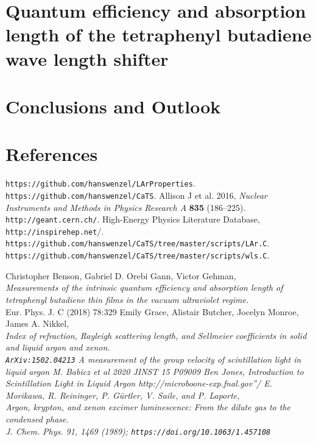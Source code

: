 \documentclass[a4paper]{jpconf}
\begin{document}
\section{Quantum efficiency and absorption length of the tetraphenyl butadiene wave length shifter}

\section{Conclusions and Outlook}

 \section*{References}

 \begin{thebibliography}{99}
   \verb|https://github.com/hanswenzel/LArProperties|.
   \verb|https://github.com/hanswenzel/CaTS|.
 Allison J et al. 2016, {\it Nuclear Instruments and Methods in Physics
                Research A} {\bf 835} (186--225).
 \verb|http://geant.cern.ch/|.
 High-Energy Physics Literature Database,
  \verb"http://inspirehep.net"/.
  \verb|https://github.com/hanswenzel/CaTS/tree/master/scripts/LAr.C|.\\
  \verb|https://github.com/hanswenzel/CaTS/tree/master/scripts/wls.C|.

 Christopher Benson, Gabriel D. Orebi Gann, Victor Gehman,\\
  {\it Measurements of the intrinsic quantum efficiency and absorption
      length of tetraphenyl butadiene thin films in the vacuum
      ultraviolet regime.}\\
Eur. Phys. J. C (2018) 78:329
Emily Grace, Alistair Butcher, Jocelyn Monroe, James A. Nikkel,\\
  \it{Index of refraction, Rayleigh scattering length, and Sellmeier coefficients in solid and liquid argon and xenon.}\\
  \verb|ArXiv:1502.04213|
  \it{A measurement of the group velocity of scintillation light in liquid argon}
  M. Babicz et al 2020 JINST 15 P09009
  Ben Jones, \it{Introduction to Scintillation Light in Liquid Argon}
  \verb''http://microboone-exp.fnal.gov''/
  E. Morikawa, R. Reininger, P. Gürtler, V. Saile, and P. Laporte,\\
\it{Argon, krypton, and xenon excimer luminescence: From the dilute gas to the
condensed phase.}\\
J. Chem. Phys. 91, 1469 (1989);
  \verb|https://doi.org/10.1063/1.457108|


  
\end{thebibliography}
\end{document}
